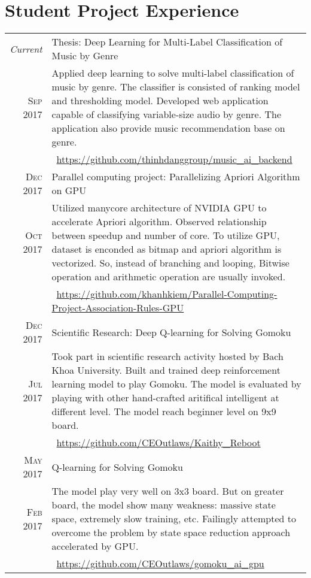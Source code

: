 \documentclass[a4paper,10pt]{article}
\begin{document}
\section{Student Project Experience}
\begin{tabular}{r|p{12cm}}
	\emph{Current} & Thesis: Deep Learning for Multi-Label Classification of Music by Genre\\ 
	\textsc{Sep 2017} & \footnotesize{Applied deep learning to solve multi-label classification of music by genre. The classifier is consisted of ranking model and thresholding model. Developed web application capable of classifying variable-size audio by genre. The application also provide music recommendation base on genre.} \\
	& \footnotesize{\faExternalLink\, \href{https://github.com/thinhdanggroup/music_ai_backend}{https://github.com/thinhdanggroup/music\_ai\_backend}}\\	
	\textsc{Dec 2017} & Parallel computing project: Parallelizing Apriori Algorithm on GPU\\
	\textsc{Oct 2017} & \footnotesize{Utilized manycore architecture of NVIDIA GPU to accelerate Apriori algorithm. Observed relationship between speedup and number of core. To utilize GPU, dataset is enconded as bitmap and apriori algorithm is vectorized. So, instead of branching and looping, Bitwise operation and arithmetic operation are usually invoked.}	\\
	& \footnotesize{\faExternalLink\, \href{https://github.com/khanhkiem/Parallel-Computing-Project-Association-Rules-GPU}{https://github.com/khanhkiem/Parallel-Computing-Project-Association-Rules-GPU}}\\
	\textsc{Dec 2017} & Scientific Research: Deep Q-learning for Solving Gomoku \\
	\textsc{Jul 2017} & \footnotesize{Took part in scientific research activity hosted by Bach Khoa University. Built and trained deep reinforcement learning model to play Gomoku. The model is evaluated by playing with other hand-crafted aritifical intelligent at different level. The model reach beginner level on 9x9 board.} \\
	& \footnotesize{\faExternalLink\, \href{https://github.com/CEOutlaws/Kaithy_Reboot}{https://github.com/CEOutlaws/Kaithy\_Reboot}}\\
	\textsc{May 2017} & Q-learning for Solving Gomoku \\
	\textsc{Feb 2017} & \footnotesize{The model play very well on 3x3 board. But on greater board, the model show many weakness: massive state space, extremely slow training, etc. Failingly attempted to overcome the problem by state space reduction approach accelerated by GPU.} \\
	& \footnotesize{\faExternalLink\, \href{https://github.com/CEOutlaws/gomoku_ai_gpu}{https://github.com/CEOutlaws/gomoku\_ai\_gpu}}\\	
\end{tabular}
\end{document}
